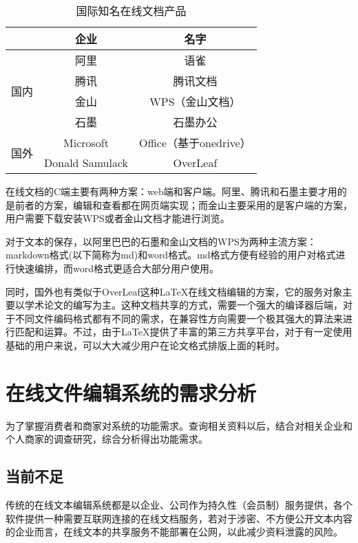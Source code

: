 \documentclass[forprint]{software}
\begin{document}
\begin{table}[!htbp]
	\centering
	\caption{国际知名在线文档产品}
	\label{tab:1}
	\begin{tabular}{ccc}
		\hline
		& 企业              & 名字                 \\ \hline
		\multirow{4}{*}{国内} & 阿里              & 语雀                 \\
		& 腾讯              & 腾讯文档               \\
		& 金山              & WPS（金山文档）          \\
		& 石墨              & 石墨办公               \\
		\multirow{2}{*}{国外} & Microsoft       & Office（基于onedrive） \\
		& Donald Samulack & OverLeaf           \\ \hline
	\end{tabular}
\end{table}

在线文档的C端主要有两种方案：web端和客户端。阿里、腾讯和石墨主要才用的是前者的方案，编辑和查看都在网页端实现；而金山主要采用的是客户端的方案，用户需要下载安装WPS或者金山文档才能进行浏览。

对于文本的保存，以阿里巴巴的石墨和金山文档的WPS为两种主流方案：markdown格式(以下简称为md)和word格式。md格式方便有经验的用户对格式进行快速编排，而word格式更适合大部分用户使用。

同时，国外也有类似于OverLeaf这种LaTeX在线文档编辑的方案，它的服务对象主要以学术论文的编写为主。这种文档共享的方式，需要一个强大的编译器后端，对于不同文件编码格式都有不同的需求，在兼容性方向需要一个极其强大的算法来进行匹配和运算。不过，由于LaTeX提供了丰富的第三方共享平台，对于有一定使用基础的用户来说，可以大大减少用户在论文格式排版上面的耗时。

\chapter{在线文件编辑系统的需求分析}

为了掌握消费者和商家对系统的功能需求。查询相关资料以后，结合对相关企业和个人商家的调查研究，综合分析得出功能需求。

\section{当前不足}

传统的在线文本编辑系统都是以企业、公司作为持久性（会员制）服务提供，各个软件提供一种需要互联网连接的在线文档服务，若对于涉密、不方便公开文本内容的企业而言，在线文本的共享服务不能部署在公网，以此减少资料泄露的风险。
\end{document}
